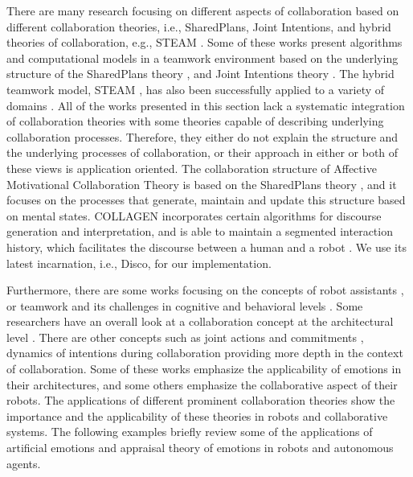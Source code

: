 There are many research focusing on different aspects of collaboration based on
different collaboration theories, i.e., SharedPlans, Joint Intentions, and
hybrid theories of collaboration, e.g., STEAM \cite{tambe:flexible-teamwork}.
Some of these works present algorithms and computational models in a
teamwork environment based on the underlying structure of the SharedPlans theory
\cite{lochbaum:collaborative-planning,lochbaum:plan-models,yen:cast,yin:knowledge-based-sharedplans},
and Joint Intentions theory
\cite{breazeal:humanoid-robots,mutlu:coordination-robot}. The hybrid teamwork
model, STEAM \cite{tambe:flexible-teamwork}, has also been successfully applied
to a variety of domains
\cite{kabil:coordination-mechanisms,kitano:robocup,marsella:robocup,scerri:robot-agent-person}.
All of the works presented in this section lack a systematic integration of
collaboration theories with some theories capable of describing underlying
collaboration processes. Therefore, they either do not explain the structure and
the underlying processes of collaboration, or their approach in either or both
of these views is application oriented. The collaboration structure of Affective
Motivational Collaboration Theory is based on the SharedPlans theory
\cite{grosz:planning-acting,grosz:collaboration,grosz:plans-discourse}, and it
focuses on the processes that generate, maintain and update this structure based
on mental states. COLLAGEN \cite{rich:collaboration-manager,rich:discourse} 
incorporates certain algorithms for discourse generation and interpretation, and
is able to maintain a segmented interaction history, which facilitates the
discourse between a human and a robot \cite{rickel:discourse-theory-dialogue}.
We use its latest incarnation, i.e., Disco, for our implementation.

Furthermore, there are some works focusing on the concepts of robot assistants
\cite{clancey:agent-assistants-collaboration}, or teamwork and its challenges in
cognitive and behavioral levels
\cite{nikolaidis:collaboration-joint-action,scerri:prototype-distributed-teams}.
Some researchers have an overall look at a collaboration concept at the
architectural level
\cite{esau:integrating-emotion-collaboration,garcia:collaboration-emotional-awareness,sofge:collaboration-humanoid-space}.
There are other concepts such as joint actions and commitments
\cite{grosz:intention-dynamics-collaboration}, dynamics of intentions during
collaboration \cite{levesque:acting-together} providing more depth in the
context of collaboration. Some of these works emphasize the applicability of
emotions in their architectures, and some others emphasize the collaborative
aspect of their robots. The applications of different prominent collaboration
theories show the importance and the applicability of these theories in robots
and collaborative systems. The following examples briefly review some of the
applications of artificial emotions and appraisal theory of emotions in robots
and autonomous agents.\\

